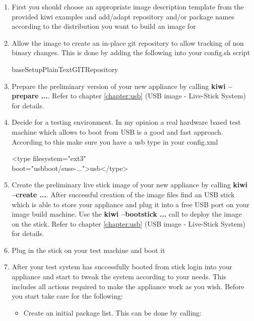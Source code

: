 \begin{enumerate}
\item First you should choose an appropriate image description template from
      the provided kiwi examples and add/adapt repository and/or
      package names according to the distribution you want to
      build an image for
\item Allow the image to create an in-place git repository to
      allow tracking of non binary changes. This is done by adding
      the following into your config.sh script
 
      \begin{Command}{8cm}
      baseSetupPlainTextGITRepository
      \end{Command}

\item Prepare the preliminary version of your new appliance by
      calling \textbf{kiwi --prepare ...}. Refer to chapter \ref{chapter:usb}
      (USB image - Live-Stick System) for details.
\item Decide for a testing environment. In my opinion a real
      hardware based test machine which allows to boot from USB
      is a good and fast approach. According to this make sure
      you have a usb type in your config.xml

      \begin{Command}{12cm}
      <type filesystem="ext3"\\
      \hspace*{1.6cm}boot="usbboot/suse-...">usb</type>
      \end{Command}

\item Create the preliminary live stick image of your new appliance
      by calling \textbf{kiwi --create ...}. After successful creation
      of the image files find an USB stick which is able to store
      your appliance and plug it into a free USB port on your image
      build machine. Use the \textbf{kiwi --bootstick ...} call to deploy
      the image on the stick. Refer to chapter \ref{chapter:usb}
      (USB image - Live-Stick System) for details.
\item Plug in the stick on your test machine and boot it
\item After your test system has successfully booted from stick login
      into your appliance and start to tweak the system according to
      your needs. This includes all actions required to make the
      appliance work as you wish. Before you start take care for
      the following:
      \begin{itemize}
      \item Create an initial package list. This can be done by calling:


\end{itemize}
\end{enumerate}

